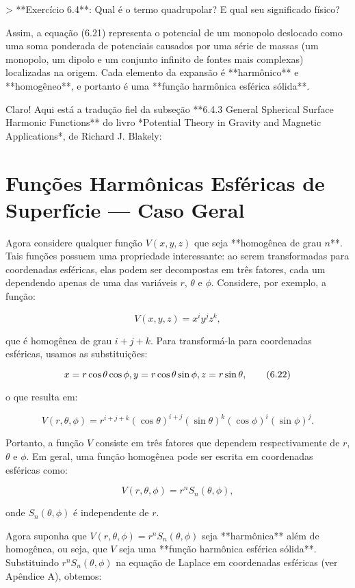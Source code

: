 > **Exercício 6.4**: Qual é o termo quadrupolar? E qual seu significado físico?

Assim, a equação (6.21) representa o potencial de um monopolo deslocado como uma soma ponderada de potenciais causados por uma série de massas (um monopolo, um dipolo e um conjunto infinito de fontes mais complexas) localizadas na origem. Cada elemento da expansão é **harmônico** e **homogêneo**, e portanto é uma **função harmônica esférica sólida**.


Claro! Aqui está a tradução fiel da subseção **6.4.3 General Spherical Surface Harmonic Functions** do livro *Potential Theory in Gravity and Magnetic Applications*, de Richard J. Blakely:

\section{Funções Harmônicas Esféricas de Superfície — Caso Geral}



Agora considere qualquer função $V(x, y, z)$ que seja **homogênea de grau $n$**. Tais funções possuem uma propriedade interessante: ao serem transformadas para coordenadas esféricas, elas podem ser decompostas em três fatores, cada um dependendo apenas de uma das variáveis $r$, $\theta$ e $\phi$. Considere, por exemplo, a função:

$$
V(x, y, z) = x^i y^j z^k,
$$

que é homogênea de grau $i + j + k$. Para transformá-la para coordenadas esféricas, usamos as substituições:

$$
x = r \cos\theta \cos\phi, \\
y = r \cos\theta \sin\phi, \\
z = r \sin\theta, \tag{6.22}
$$

o que resulta em:

$$
V(r, \theta, \phi) = r^{i+j+k} (\cos\theta)^{i+j} (\sin\theta)^k (\cos\phi)^i (\sin\phi)^j.
$$

Portanto, a função $V$ consiste em três fatores que dependem respectivamente de $r$, $\theta$ e $\phi$. Em geral, uma função homogênea pode ser escrita em coordenadas esféricas como:

$$
V(r, \theta, \phi) = r^n S_n(\theta, \phi),
$$

onde $S_n(\theta, \phi)$ é independente de $r$.

Agora suponha que $V(r, \theta, \phi) = r^n S_n(\theta, \phi)$ seja **harmônica** além de homogênea, ou seja, que $V$ seja uma **função harmônica esférica sólida**. Substituindo $r^n S_n(\theta, \phi)$ na equação de Laplace em coordenadas esféricas (ver Apêndice A), obtemos:

